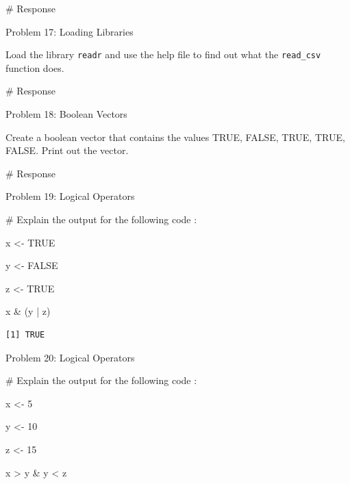 \documentclass[
  letterpaper,
  DIV=11,
  numbers=noendperiod]{scrreprt}
\newenvironment{Shaded}{\begin{snugshade}}{\end{snugshade}}
\newcommand{\CommentTok}[1]{\textcolor[rgb]{0.37,0.37,0.37}{#1}}
\newcommand{\ConstantTok}[1]{\textcolor[rgb]{0.56,0.35,0.01}{#1}}
\newcommand{\DecValTok}[1]{\textcolor[rgb]{0.68,0.00,0.00}{#1}}
\newcommand{\NormalTok}[1]{\textcolor[rgb]{0.00,0.23,0.31}{#1}}
\newcommand{\OtherTok}[1]{\textcolor[rgb]{0.00,0.23,0.31}{#1}}
\newcommand{\SpecialCharTok}[1]{\textcolor[rgb]{0.37,0.37,0.37}{#1}}
\begin{document}
\begin{Shaded}
\begin{Highlighting}[]
\CommentTok{\# Response}
\end{Highlighting}
\end{Shaded}

Problem 17: Loading Libraries

Load the library \texttt{readr} and use the help file to find out what
the \texttt{read\_csv} function does.

\begin{Shaded}
\begin{Highlighting}[]
\CommentTok{\# Response}
\end{Highlighting}
\end{Shaded}

Problem 18: Boolean Vectors

Create a boolean vector that contains the values TRUE, FALSE, TRUE,
TRUE, FALSE. Print out the vector.

\begin{Shaded}
\begin{Highlighting}[]
\CommentTok{\# Response}
\end{Highlighting}
\end{Shaded}

Problem 19: Logical Operators

\begin{Shaded}
\begin{Highlighting}[]
\CommentTok{\# Explain the output for the following code :}

\NormalTok{x }\OtherTok{\textless{}{-}} \ConstantTok{TRUE}

\NormalTok{y }\OtherTok{\textless{}{-}} \ConstantTok{FALSE}

\NormalTok{z }\OtherTok{\textless{}{-}} \ConstantTok{TRUE}

\NormalTok{x }\SpecialCharTok{\&}\NormalTok{ (y }\SpecialCharTok{|}\NormalTok{ z)}
\end{Highlighting}
\end{Shaded}

\begin{verbatim}
[1] TRUE
\end{verbatim}

Problem 20: Logical Operators

\begin{Shaded}
\begin{Highlighting}[]
\CommentTok{\# Explain the output for the following code :}

\NormalTok{x }\OtherTok{\textless{}{-}} \DecValTok{5}

\NormalTok{y }\OtherTok{\textless{}{-}} \DecValTok{10}

\NormalTok{z }\OtherTok{\textless{}{-}} \DecValTok{15}

\NormalTok{x }\SpecialCharTok{\textgreater{}}\NormalTok{ y }\SpecialCharTok{\&}\NormalTok{ y }\SpecialCharTok{\textless{}}\NormalTok{ z}
\end{Highlighting}
\end{Shaded}
\end{document}
